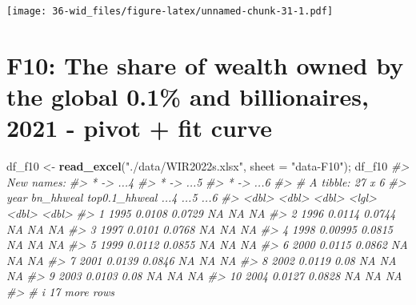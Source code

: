 \documentclass[
  xelatex, ja=standard]{bxjsbook}
\newenvironment{Shaded}{\begin{snugshade}}{\end{snugshade}}
\newcommand{\AttributeTok}[1]{\textcolor[rgb]{0.13,0.29,0.53}{#1}}
\newcommand{\CommentTok}[1]{\textcolor[rgb]{0.56,0.35,0.01}{\textit{#1}}}
\newcommand{\FunctionTok}[1]{\textcolor[rgb]{0.13,0.29,0.53}{\textbf{#1}}}
\newcommand{\NormalTok}[1]{#1}
\newcommand{\OtherTok}[1]{\textcolor[rgb]{0.56,0.35,0.01}{#1}}
\newcommand{\StringTok}[1]{\textcolor[rgb]{0.31,0.60,0.02}{#1}}
\theoremstyle{definition}
\theoremstyle{definition}
\theoremstyle{definition}
\theoremstyle{definition}
\theoremstyle{remark}
\begin{document}
\texttt{[image: 36-wid\_files/figure-latex/unnamed-chunk-31-1.pdf]}

\hypertarget{f10-the-share-of-wealth-owned-by-the-global-0.1-and-billionaires-2021---pivot-fit-curve}{%
\section{F10: The share of wealth owned by the global 0.1\% and billionaires, 2021 - pivot + fit curve}\label{f10-the-share-of-wealth-owned-by-the-global-0.1-and-billionaires-2021---pivot-fit-curve}}

\begin{Shaded}
\begin{Highlighting}[]
\NormalTok{df\_f10 }\OtherTok{\textless{}{-}} \FunctionTok{read\_excel}\NormalTok{(}\StringTok{"./data/WIR2022s.xlsx"}\NormalTok{, }\AttributeTok{sheet =} \StringTok{"data{-}F10"}\NormalTok{); df\_f10}
\CommentTok{\#\textgreater{} New names:}
\CommentTok{\#\textgreater{} * \textasciigrave{}\textasciigrave{} {-}\textgreater{} \textasciigrave{}...4\textasciigrave{}}
\CommentTok{\#\textgreater{} * \textasciigrave{}\textasciigrave{} {-}\textgreater{} \textasciigrave{}...5\textasciigrave{}}
\CommentTok{\#\textgreater{} * \textasciigrave{}\textasciigrave{} {-}\textgreater{} \textasciigrave{}...6\textasciigrave{}}
\CommentTok{\#\textgreater{} \# A tibble: 27 x 6}
\CommentTok{\#\textgreater{}     year bn\_hhweal top0.1\_hhweal ...4   ...5  ...6}
\CommentTok{\#\textgreater{}    \textless{}dbl\textgreater{}     \textless{}dbl\textgreater{}         \textless{}dbl\textgreater{} \textless{}lgl\textgreater{} \textless{}dbl\textgreater{} \textless{}dbl\textgreater{}}
\CommentTok{\#\textgreater{}  1  1995   0.0108         0.0729 NA       NA    NA}
\CommentTok{\#\textgreater{}  2  1996   0.0114         0.0744 NA       NA    NA}
\CommentTok{\#\textgreater{}  3  1997   0.0101         0.0768 NA       NA    NA}
\CommentTok{\#\textgreater{}  4  1998   0.00995        0.0815 NA       NA    NA}
\CommentTok{\#\textgreater{}  5  1999   0.0112         0.0855 NA       NA    NA}
\CommentTok{\#\textgreater{}  6  2000   0.0115         0.0862 NA       NA    NA}
\CommentTok{\#\textgreater{}  7  2001   0.0139         0.0846 NA       NA    NA}
\CommentTok{\#\textgreater{}  8  2002   0.0119         0.08   NA       NA    NA}
\CommentTok{\#\textgreater{}  9  2003   0.0103         0.08   NA       NA    NA}
\CommentTok{\#\textgreater{} 10  2004   0.0127         0.0828 NA       NA    NA}
\CommentTok{\#\textgreater{} \# i 17 more rows}
\end{Highlighting}
\end{Shaded}
\end{document}
